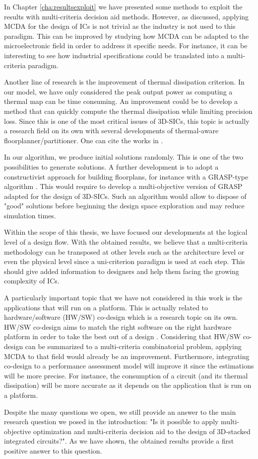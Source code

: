In Chapter \ref{cha:resultsexploit} we have presented some methods to exploit the results with multi-criteria decision aid methods. However, as discussed, applying MCDA for the design of ICs is not trivial as the industry is not used to this paradigm. This can be improved by studying how MCDA can be adapted to the microelectronic field in order to address it specific needs. For instance, it can be interesting to see how industrial specifications could be translated into a multi-criteria paradigm.

Another line of research is the improvement of thermal dissipation criterion. In our model, we have only considered the peak output power as computing a thermal map can be time consuming. An improvement could be to develop a method that can quickly compute the thermal dissipation while limiting precision loss. Since this is one of the most critical issues of 3D-SICs, this topic is actually a research field on its own with several developments of thermal-aware floorplanner/partitioner. One can cite the works in \cite{1594713,1112292,1486402}.

In our algorithm, we produce initial solutions randomly. This is one of the two possibilities to generate solutions. A further development is to adopt a constructivist approach for building floorplans, for instance with a GRASP-type algorithm \cite{HarSho87a,DBLP:dblp_conf/sccc/ViannaAVA05}. This would require to develop a multi-objective version of GRASP adapted for the design of 3D-SICs. Such an algorithm would allow to dispose of "good" solutions before beginning the design space exploration and may reduce simulation times.

Within the scope of this thesis, we have focused our developments at the logical level of a design flow. With the obtained results, we believe that a multi-criteria methodology can be transposed at other levels such as the architecture level or even the physical level since a uni-criterion paradigm is used at each step. This should give added information to designers and help them facing the growing complexity of ICs.

A particularly important topic that we have not considered in this work is the applications that will run on a platform. This is actually related to hardware/software (HW/SW) co-design which is a research topic on its own. HW/SW co-design aims to match the right software on the right hardware platform in order to take the best out of a design \cite{abdallah2011}. Considering that HW/SW co-design can be summarized to a multi-criteria combinatorial problem, applying MCDA to that field would already be an improvement. Furthermore, integrating co-design to a performance assessment model will improve it since the estimations will be more precise. For instance, the consumption of a circuit (and its thermal dissipation) will be more accurate as it depends on the application that is run on a platform.

Despite the many questions we open, we still provide an answer to the main research question we posed in the introduction: "Is it possible to apply multi-objective optimization and multi-criteria decision aid to the design of 3D-stacked integrated circuits?". As we have shown, the obtained results provide a first positive answer to this question.